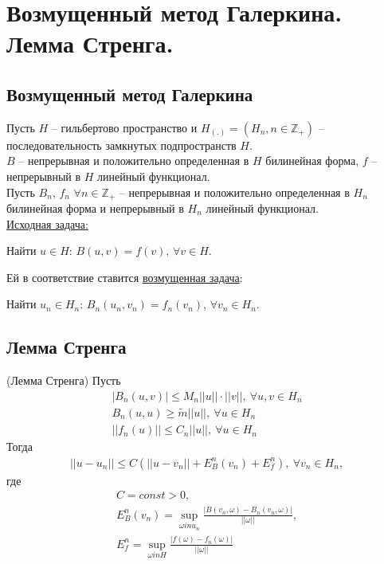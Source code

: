 \documentclass[__main__.tex]{subfiles}
\begin{document}
\section{Возмущенный метод Галеркина. Лемма Стренга.}

\subsection{Возмущенный метод Галеркина}

Пусть $H$ -- гильбертово пространство и $H_{(.)}=(H_n, n \in \mathbb{Z}_+)$ -- последовательность замкнутых подпространств $H$.\\
$B$ -- непрерывная и положительно определенная в $H$ билинейная форма, $f$ -- непрерывный в $H$ линейный функционал. \\
Пусть $B_n$, $f_n$ $\forall n \in \mathbb{Z}_+$ -- непрерывная и положительно определенная в $H_n$ билинейная форма и непрерывный в $H_n$ линейный функционал.\\
\underline{Исходная задача:}
\begin{center}
    Найти $u \in H$: $B(u, v)=f(v)$, $\forall v \in H$.
\end{center}
Ей в соответствие ставится \underline{возмущенная задача}:
\begin{center}
    Найти $u_n \in H_n$: $B_n(u_n, v_n)=f_n(v_n)$, $\forall v_n \in H_n$.
\end{center}

\subsection{Лемма Стренга}

\begin{theorem}
    (Лемма Стренга) Пусть
    \begin{gather*}
         |B_n(u,v)|\leqslant M_n ||u||\cdot ||v||, \ \forall u, v \in H_n\\
         B_n(u,u) \geqslant \tilde{m} ||u||, \ \forall u \in H_n\\
         ||f_n(u)||\leqslant C_n||u||, \ \forall u \in H_n
    \end{gather*}
    Тогда 
    \begin{gather*}
        ||u-u_n||\leqslant C (||u-v_n||+E^n_B(v_n)+E^n_f), \ \forall v_n \in H_n,
    \end{gather*}
    где 
    \begin{gather*}
        C=const>0, \\
        E^n_B(v_n)=\sup_{\omega in u_n} \frac{|B(v_n, \omega)-B_n(v_n, \omega)|}{||\omega||},\\
        E^n_f=\sup_{\omega in H} \frac{|f(\omega)-f_n(\omega)|}{||\omega||}
    \end{gather*}
\end{theorem}
\end{document}
